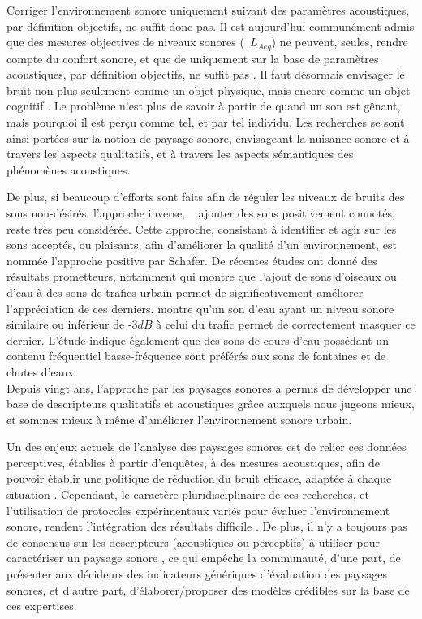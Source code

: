 Corriger l'environnement sonore uniquement suivant des paramètres acoustiques, par définition objectifs, ne suffit donc pas. Il est aujourd'hui communément admis que des mesures objectives de niveaux sonores (\eg~$L_{Aeq}$) ne peuvent, seules, rendre compte du confort sonore, et que de  uniquement sur la base de paramètres acoustiques, par définition objectifs, ne suffit pas \citep{yang2005acoustic,schulte2006soundscape,kang2010semantic,aletta2016soundscape}. Il faut désormais envisager le bruit non plus seulement comme un objet physique, mais encore comme un objet cognitif \citep{guastavino_etude_2003}. Le problème n'est plus de savoir à partir de quand un son est gênant, mais pourquoi il est perçu comme tel, et par tel individu. Les recherches se sont ainsi portées sur la notion de paysage sonore, envisageant la nuisance sonore et à travers les aspects qualitatifs, et à travers les aspects sémantiques des phénomènes acoustiques.

De plus, si beaucoup d’efforts sont faits afin de réguler les niveaux de bruits des sons non-désirés,  l'approche inverse, \ie~ ajouter des sons positivement connotés, reste très peu considérée. Cette approche, consistant à identifier et agir sur les sons acceptés, ou plaisants, afin d'améliorer la qualité d'un environnement, est nommée l'approche positive par Schafer. De récentes études ont donné des résultats prometteurs, notamment \citep{hong2013designing} qui montre que l'ajout de sons d'oiseaux ou d'eau à des sons de trafics urbain permet de significativement améliorer l'appréciation de ces derniers. \citep{galbrun2012perceptual} montre qu'un son d'eau ayant un niveau sonore similaire ou inférieur de -3$dB$ à celui du trafic permet de correctement masquer ce dernier. L'étude indique également que des sons de cours d'eau possédant un contenu fréquentiel basse-fréquence sont préférés aux sons de fontaines et de chutes d'eaux.\\

Depuis vingt ans, l'approche par les paysages sonores a permis de développer une base de descripteurs qualitatifs et acoustiques grâce auxquels nous jugeons mieux, et sommes mieux à même d'améliorer l'environnement sonore urbain.  \citep{kang2006urban,schulte2007soundscape}

Un des enjeux actuels de l'analyse des paysages sonores est de relier ces données perceptives, établies à partir d'enquêtes, à des mesures acoustiques, afin de pouvoir établir une politique de réduction du bruit efficace, adaptée à chaque situation \citep{schulte2013soundscape}.
Cependant, le caractère pluridisciplinaire de ces recherches, et l'utilisation de protocoles expérimentaux variés pour évaluer l'environnement sonore, rendent l’intégration des résultats difficile \citep{davies2013perception}. De plus, il n'y a toujours pas de consensus sur les descripteurs (acoustiques ou perceptifs) à utiliser pour caractériser un paysage sonore \citep{brocolini2012prediction,aletta2016soundscape}, ce qui empêche la communauté, d'une part, de présenter aux décideurs des indicateurs génériques d'évaluation des paysages sonores, et d'autre part, d'élaborer/proposer des modèles crédibles sur la base de ces expertises.

